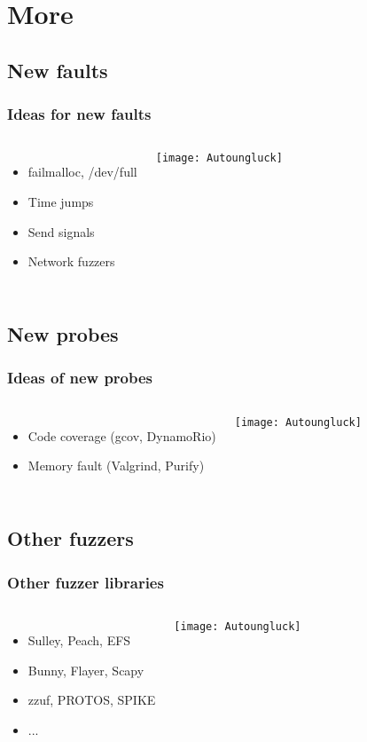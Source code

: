 \section{More}

\subsection{New faults}
\frame
{
    \frametitle{Ideas for new faults}

    \begin{columns}[c]
        \column{2.5in}
            \begin{itemize}
            \item failmalloc, /dev/full
            \item Time jumps
            \item Send signals
            \item Network fuzzers
            \end{itemize}

        \column{2.3in}
            \texttt{[image: Autoungluck]}
    \end{columns}
}

\subsection{New probes}
\frame
{
    \frametitle{Ideas of new probes}

    \begin{columns}[c]
        \column{2.5in}
            \begin{itemize}
            \item Code coverage (gcov, DynamoRio)
            \item Memory fault (Valgrind, Purify)
            \end{itemize}

        \column{2.3in}
            \texttt{[image: Autoungluck]}
    \end{columns}
}

\subsection{Other fuzzers}
\frame
{
    \frametitle{Other fuzzer libraries}

    \begin{columns}[c]
        \column{2.5in}
            \begin{itemize}
            \item Sulley, Peach, EFS
            \item Bunny, Flayer, Scapy
            \item zzuf, PROTOS, SPIKE
            \item ...
            \end{itemize}

        \column{2.3in}
            \texttt{[image: Autoungluck]}
    \end{columns}
}

